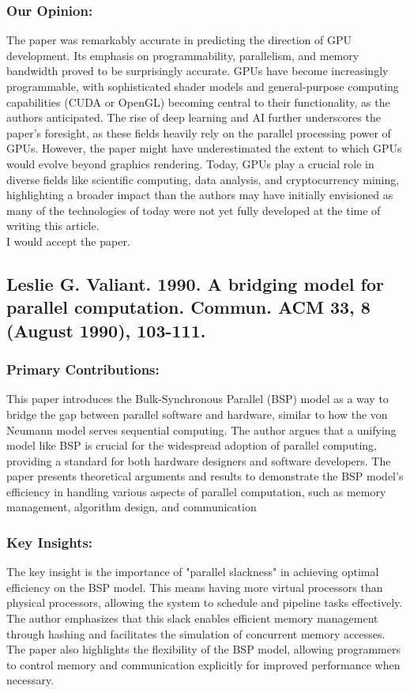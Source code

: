 \documentclass[12pt]{article}
\begin{document}
\subsubsection{Our Opinion:}
The paper was remarkably accurate in predicting the direction of GPU development. Its emphasis on programmability, parallelism, and memory bandwidth proved to be surprisingly accurate. GPUs have become increasingly programmable, with sophisticated shader models and general-purpose computing capabilities (CUDA or OpenGL) becoming central to their functionality, as the authors anticipated. The rise of deep learning and AI further underscores the paper's foresight, as these fields heavily rely on the parallel processing power of GPUs. However, the paper might have underestimated the extent to which GPUs would evolve beyond graphics rendering. Today, GPUs play a crucial role in diverse fields like scientific computing, data analysis, and cryptocurrency mining, highlighting a broader impact than the authors may have initially envisioned as many of the technologies of today were not yet fully developed  at the time of writing this article.\\
\newline
I would accept the paper.

\subsection{Leslie G. Valiant. 1990. A bridging model for parallel computation. Commun. ACM 33, 8 (August 1990), 103-111.}

\subsubsection{Primary Contributions:}
This paper introduces the Bulk-Synchronous Parallel (BSP) model as a way to bridge the gap between parallel software and hardware, similar to how the von Neumann model serves sequential computing.  The author argues that a unifying model like BSP is crucial for the widespread adoption of parallel computing, providing a standard for both hardware designers and software developers.  The paper presents theoretical arguments and results to demonstrate the BSP model's efficiency in handling various aspects of parallel computation, such as memory management, algorithm design, and communication

\subsubsection{Key Insights:}
 The key insight is the importance of "parallel slackness" in achieving optimal efficiency on the BSP model.  This means having more virtual processors than physical processors, allowing the system to schedule and pipeline tasks effectively.  The author emphasizes that this slack enables efficient memory management through hashing and facilitates the simulation of concurrent memory accesses.  The paper also highlights the flexibility of the BSP model, allowing programmers to control memory and communication explicitly for improved performance when necessary.
\end{document}
